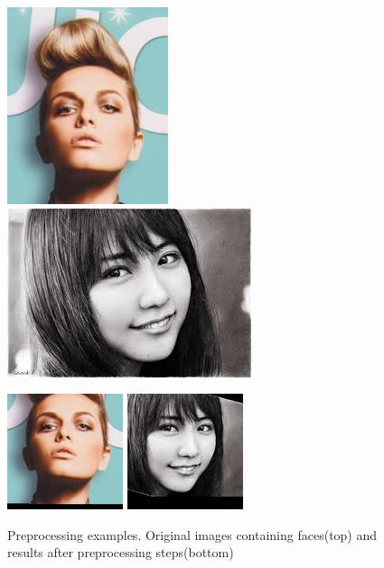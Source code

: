 \begin{figure}[ht]
    \label{BibSamples}
    \begin{center}
    \includegraphics[scale=0.6]{Graphics/000005.jpg}
    \includegraphics[scale=0.6]{Graphics/00000013_orig.jpeg}

    \includegraphics[scale=0.6]{Graphics/000004.png}
    \includegraphics[scale=0.6]{Graphics/00000013.jpeg}
    \end{center}
    \caption{Preprocessing examples. Original images containing faces(top) and results after preprocessing steps(bottom)}
\end{figure}

